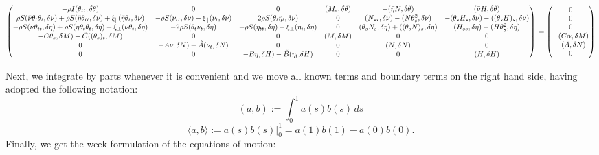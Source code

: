 \[\begin{pmatrix}
-\rho I (\theta_{tt},\delta\theta) & 0 & 0 & (M_s,\delta\theta) & -(\bar{\eta}N,\delta\theta) & (\bar{\nu}H,\delta\theta) 
\\
\rho S(\bar{\nu}\bar{\theta}_t\theta_t,\delta\nu) + \rho S (\bar{\eta}\theta_{tt},\delta\nu) + \xi_{\parallel}(\bar{\eta}\theta_t,\delta\nu) & -\rho S (\nu_{tt},\delta\nu) -\xi_{\parallel}(\nu_t,\delta\nu) & 2 \rho S(\bar{\theta}_t\eta_t,\delta\nu) & 0 & (N_{ss},\delta\nu) - (N\bar{\theta}_s^2,\delta\nu) & -(\bar{\theta}_s H_s,\delta\nu) - ((\bar{\theta}_s H)_s,\delta\nu) 
\\
-\rho S (\bar{\nu}\theta_{tt},\delta\eta) + \rho S (\bar{\eta}\bar{\theta}_t\theta_t,\delta\eta) - \xi_{\perp}(\bar{\nu}\theta_t,\delta\eta) & - 2\rho S (\bar{\theta}_t \nu_t,\delta\eta) & -\rho S (\eta_{tt},\delta\eta) - \xi_{\perp}(\eta_t,\delta\eta) & 0 & (\bar{\theta}_s N_s, \delta\eta) + ((\bar{\theta}_s N)_s,\delta\eta) & (H_{ss},\delta\eta) - (H\bar{\theta}_s^2,\delta\eta) 
\\
-C\theta_s,\delta M) -\tilde{C}((\theta_s)_t,\delta M) & 0 & 0 & (M, \delta M) & 0 & 0 
\\
0 & -A\nu,\delta N) -\tilde{A}(\nu_t,\delta N) & 0 & 0 & (N, \delta N) & 0 
\\
0 & 0 & -B\eta,\delta H) - \tilde{B}(\eta_t. \delta H) & 0 & 0 & (H, \delta H) 
\end{pmatrix}
\\ =
\begin{pmatrix}
0\\
0\\
0\\
-(C\alpha,\delta M) \\
-(A,\delta N) \\
0
\end{pmatrix}\]

Next, we integrate by parts whenever it is convenient and we move all known terms and boundary terms on the right hand side, having adopted the following notation:
\[
(a,b) := \int_0^1 a(s) b(s) \, ds
\]
\[
\langle a,b \rangle := a(s) b(s) \big|^1_0 = a(1)b(1)-a(0)b(0).
\]
Finally, we get the week formulation of the equations of motion:

